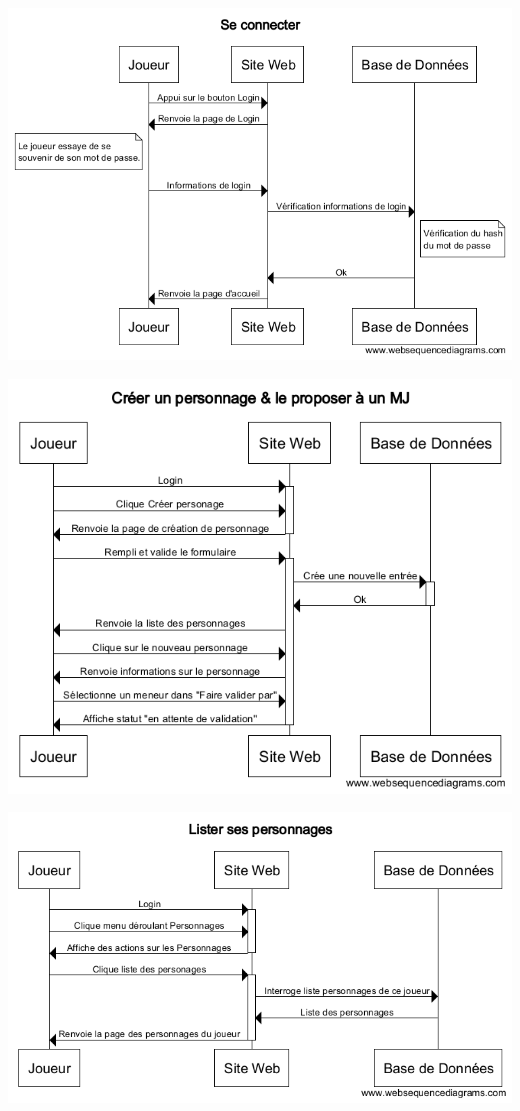 \documentclass[a4paper, 11pt, titlepage]{article}
\begin{document}
\begin{center}
\includegraphics[scale=0.55]{sequence/Connection.png}
\end{center}

\begin{center}
\includegraphics[scale=0.55]{sequence/CreerPersonnageEtProposerMJ.png}
\end{center}

\begin{center}
\includegraphics[scale=0.55]{sequence/ListerPersonnages.png}
\end{center}
\end{document}
